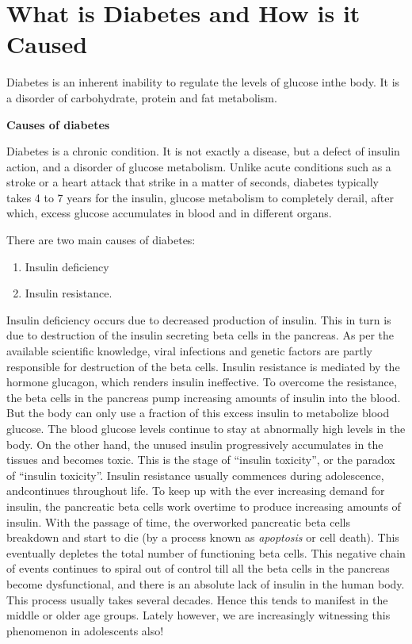 \chapter{What is Diabetes and How is it Caused}\label{chap3}

Diabetes is an inherent inability to regulate the levels of glucose in\break the body. It is a disorder of carbohydrate, protein and fat metabolism.

\noindent
\textbf{Causes of diabetes}

Diabetes is a chronic condition. It is not exactly a disease, but a defect of insulin action, and a disorder of glucose metabolism. Unlike acute conditions such as a stroke or a heart attack that strike in a matter of seconds, diabetes typically takes 4 to 7 years for the insulin, glucose metabolism to completely derail, after which, excess glucose accumulates in blood and in different organs.

There are two main causes of diabetes:
\begin{enumerate}
\itemsep=0pt
\item Insulin deficiency
 \item Insulin resistance.
\end{enumerate}

Insulin deficiency occurs due to decreased production of insulin. This in turn is due to destruction of the insulin secreting beta cells in the pancreas. As per the available scientific knowledge, viral infe\-ctions and genetic factors are partly responsible for destruction of the beta cells. Insulin resistance is mediated by the hormone glucagon, which renders insulin ineffective. To overcome the resistance, the beta cells in the pancreas pump increasing amounts of insulin into the blood. But the body can only use a fraction of this excess insulin to meta\-bolize blood glucose. The blood glucose levels continue to stay at abnormally high levels in the body. On the other hand, the unused insu\-lin progressively accumulates in the tissues and becomes toxic. This is the stage of “insulin toxicity”, or the paradox of “insulin toxi\-city”. Insulin resi\-stance usually commences during adolescence, and\break continues throughout life. To keep up with the ever increasing demand for insulin, the pancreatic beta cells work overtime to produce increasing amounts of insulin. With the passage of time, the overworked pancreatic beta cells breakdown and start to die (by a process known as \textit{apoptosis} or cell death). This eventually depletes the total number of functioning beta cells. This negative chain of events conti\-nues to spiral out of control till all the beta cells in the pancreas become dysfunc\-tional, and there is an absolute lack of insulin in the human body. This process usually takes several decades. Hence this tends to manifest in the middle or older age groups. Lately however, we are increasingly witnessing this phenomenon in adolescents also!

